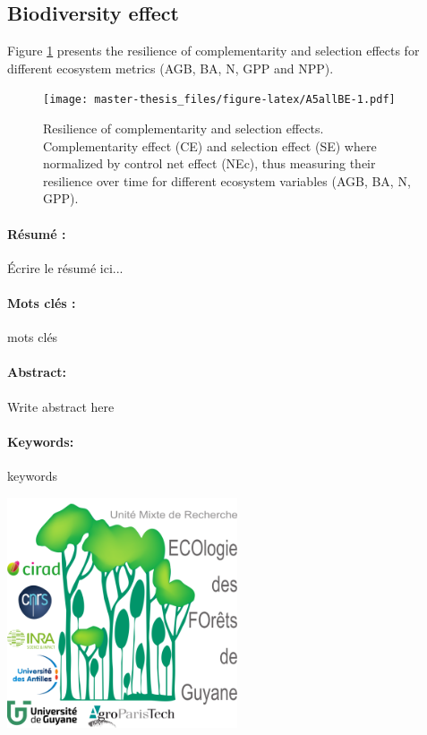 \documentclass[12pt,]{article}
\theoremstyle{definition}
\theoremstyle{definition}
\theoremstyle{remark}
\begin{document}
\subsection{Biodiversity effect}\label{biodiversity-effect-2}

Figure \ref{fig:A5allBE} presents the resilience of complementarity and
selection effects for different ecosystem metrics (AGB, BA, N, GPP and
NPP).

\begin{figure}[htbp]
\centering
\texttt{[image: master-thesis\_files/figure-latex/A5allBE-1.pdf]}
\caption{\label{fig:A5allBE}Resilience of complementarity and selection
effects. Complementarity effect (CE) and selection effect (SE) where
normalized by control net effect (NEc), thus measuring their resilience
over time for different ecosystem variables (AGB, BA, N, GPP).}
\end{figure}


\listoftables
\listoffigures

  \newpage
  \paragraph{Résumé :}
  Écrire le résumé ici...
  \paragraph{Mots clés :} mots clés
  \newline\newline
  \paragraph{Abstract:}
  Write abstract here
  \paragraph{Keywords:} keywords
  
  \vspace*{\fill}
  \includegraphics{images/logo}
\end{document}
